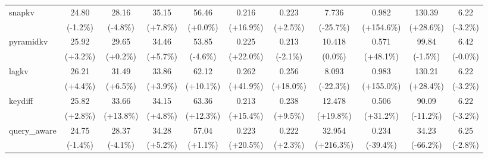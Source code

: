 \begin{table}[t]
{\begin{tabular}{l|cccccccccc}
    snapkv & 24.80 & 28.16 & 35.15 & 56.46 & 0.216 & 0.223 & 7.736 & 0.982 & 130.39 & 6.22 \\
     & {\tiny\color{green!60!black}(-1.2\%)} & {\tiny\color{green!60!black}(-4.8\%)} & {\tiny\color{red!70!black}(+7.8\%)} & {\tiny\color{red!70!black}(+0.0\%)} & {\tiny\color{red!70!black}(+16.9\%)} & {\tiny\color{red!70!black}(+2.5\%)} & {\tiny\color{green!60!black}(-25.7\%)} & {\tiny\color{red!70!black}(+154.6\%)} & {\tiny\color{green!60!black}(+28.6\%)} & {\tiny\color{green!60!black}(-3.2\%)} \\
    pyramidkv & 25.92 & 29.65 & 34.46 & 53.85 & 0.225 & 0.213 & 10.418 & 0.571 & 99.84 & 6.42 \\
     & {\tiny\color{red!70!black}(+3.2\%)} & {\tiny\color{red!70!black}(+0.2\%)} & {\tiny\color{red!70!black}(+5.7\%)} & {\tiny\color{green!60!black}(-4.6\%)} & {\tiny\color{red!70!black}(+22.0\%)} & {\tiny\color{green!60!black}(-2.1\%)} & {\tiny\color{gray}(0.0\%)} & {\tiny\color{red!70!black}(+48.1\%)} & {\tiny\color{red!70!black}(-1.5\%)} & {\tiny\color{green!60!black}(-0.0\%)} \\
    lagkv & 26.21 & 31.49 & 33.86 & 62.12 & 0.262 & 0.256 & 8.093 & 0.983 & 130.21 & 6.22 \\
     & {\tiny\color{red!70!black}(+4.4\%)} & {\tiny\color{red!70!black}(+6.5\%)} & {\tiny\color{red!70!black}(+3.9\%)} & {\tiny\color{red!70!black}(+10.1\%)} & {\tiny\color{red!70!black}(+41.9\%)} & {\tiny\color{red!70!black}(+18.0\%)} & {\tiny\color{green!60!black}(-22.3\%)} & {\tiny\color{red!70!black}(+155.0\%)} & {\tiny\color{green!60!black}(+28.4\%)} & {\tiny\color{green!60!black}(-3.2\%)} \\
    keydiff & 25.82 & 33.66 & 34.15 & 63.36 & 0.213 & 0.238 & 12.478 & 0.506 & 90.09 & 6.22 \\
     & {\tiny\color{red!70!black}(+2.8\%)} & {\tiny\color{red!70!black}(+13.8\%)} & {\tiny\color{red!70!black}(+4.8\%)} & {\tiny\color{red!70!black}(+12.3\%)} & {\tiny\color{red!70!black}(+15.4\%)} & {\tiny\color{red!70!black}(+9.5\%)} & {\tiny\color{red!70!black}(+19.8\%)} & {\tiny\color{red!70!black}(+31.2\%)} & {\tiny\color{red!70!black}(-11.2\%)} & {\tiny\color{green!60!black}(-3.2\%)} \\
    query\_aware & 24.75 & 28.37 & 34.28 & 57.04 & 0.223 & 0.222 & 32.954 & 0.234 & 34.23 & 6.25 \\
     & {\tiny\color{green!60!black}(-1.4\%)} & {\tiny\color{green!60!black}(-4.1\%)} & {\tiny\color{red!70!black}(+5.2\%)} & {\tiny\color{red!70!black}(+1.1\%)} & {\tiny\color{red!70!black}(+20.5\%)} & {\tiny\color{red!70!black}(+2.3\%)} & {\tiny\color{red!70!black}(+216.3\%)} & {\tiny\color{green!60!black}(-39.4\%)} & {\tiny\color{red!70!black}(-66.2\%)} & {\tiny\color{green!60!black}(-2.8\%)} \\

\end{tabular}}
\end{table}
